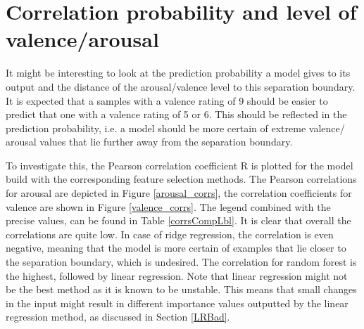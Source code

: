 \section{Correlation probability and level of valence/arousal}

It might be interesting to look at the prediction probability a model gives to its output and the distance of the arousal/valence level to this separation boundary. It is expected that a samples with a valence rating of 9 should be easier to predict that one with a valence rating of 5 or 6. This should be reflected in the prediction probability, i.e. a model should be more certain of extreme valence/ arousal values that lie further away from the separation boundary.

\npar

To investigate this, the Pearson correlation coefficient R is plotted for the model build with the corresponding feature selection methods. The Pearson correlations for arousal are depicted in Figure \ref{arousal_corrs}, the correlation coefficients for valence are shown in Figure \ref{valence_corrs}. The legend combined with the precise values, can be found in Table \ref{corrsCompLbl}. It is clear that overall the correlations are quite low. In case of ridge regression, the correlation is even negative, meaning that the model is more certain of examples that lie closer to the separation boundary, which is undesired. The correlation for random forest is the highest, followed by linear regression. Note that linear regression might not be the best method as it is known to be unstable. This means that small changes in the input might result in different importance values outputted by the linear regression method, as discussed in Section \ref{LRBad}.

